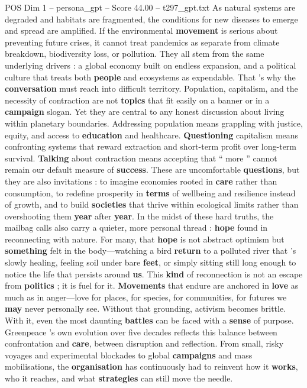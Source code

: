 \begin{textsample}{POS Dim 1 – persona\_gpt – Score 44.00 – t297\_gpt.txt}
As natural systems are degraded and habitats are fragmented, the conditions for new diseases to emerge and spread are amplified.
If the environmental \textbf{movement} is serious about preventing future crises, it cannot treat pandemics as separate from climate breakdown, biodiversity loss, or pollution.
They all stem from the same underlying drivers : a global economy built on endless expansion, and a political culture that treats both \textbf{people} and ecosystems as expendable.
That ’s why the \textbf{conversation} must reach into difficult territory.
Population, capitalism, and the necessity of contraction are not \textbf{topics} that fit easily on a banner or in a \textbf{campaign} slogan.
Yet they are central to any honest discussion about living within planetary boundaries.
Addressing population means grappling with justice, equity, and access to \textbf{education} and healthcare. \textbf{Questioning} capitalism means confronting systems that reward extraction and short-term profit over long-term survival. \textbf{Talking} about contraction means accepting that “ more ” cannot remain our default measure of \textbf{success}.
These are uncomfortable \textbf{questions}, but they are also invitations : to imagine economies rooted in \textbf{care} rather than consumption, to redefine prosperity in \textbf{terms} of wellbeing and resilience instead of growth, and to build \textbf{societies} that thrive within ecological limits rather than overshooting them \textbf{year} after \textbf{year}.
In the midst of these hard truths, the mailbag calls also carry a quieter, more personal thread : \textbf{hope} found in reconnecting with nature.
For many, that \textbf{hope} is not abstract optimism but \textbf{something} felt in the body—watching a bird \textbf{return} to a polluted river that ’s slowly healing, feeling soil under bare \textbf{feet}, or simply sitting still long enough to notice the life that persists around \textbf{us}.
This \textbf{kind} of reconnection is not an escape from \textbf{politics} ; it is fuel for it. \textbf{Movements} that endure are anchored in \textbf{love} as much as in anger—love for places, for species, for communities, for futures we \textbf{may} never personally see.
Without that grounding, activism becomes brittle.
With it, even the most daunting \textbf{battles} can be faced with a \textbf{sense} of purpose.
Greenpeace ’s own evolution over five decades reflects this balance between confrontation and \textbf{care}, between disruption and reflection.
From small, risky voyages and experimental blockades to global \textbf{campaigns} and mass mobilisations, the \textbf{organisation} has continuously had to reinvent how it \textbf{works}, who it reaches, and what \textbf{strategies} can still move the needle.

\end{textsample}
